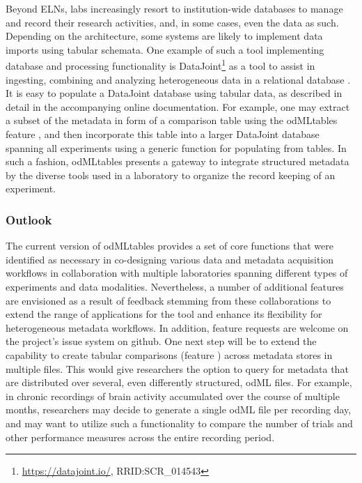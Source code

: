 Beyond ELNs, labs increasingly resort to institution-wide databases to manage and record their research activities, and, in some cases, even the data as such. Depending on the architecture, some systems are likely to implement data imports using tabular schemata. One example of such a tool implementing database and processing functionality is DataJoint\footnote{\url{https://datajoint.io/}, RRID:SCR\_014543} as a tool to assist in ingesting, combining and analyzing heterogeneous data in a relational database \citep{Yatsenko_2015}. It is easy to populate a DataJoint database using tabular data, as described in detail in the accompanying online documentation. For example, one may extract a subset of the metadata in form of a comparison table using the odMLtables feature \fcompare, and then incorporate this table into a larger DataJoint database spanning all experiments using a generic function for populating from  tables. In such a fashion, odMLtables presents a gateway to integrate structured metadata by the diverse tools used in a laboratory to organize the record keeping of an experiment.

\subsubsection{Outlook}
The current version of odMLtables provides a set of core functions that were identified as necessary in co-designing various data and metadata acquisition workflows in collaboration with multiple laboratories spanning different types of experiments and data modalities. Nevertheless, a number of additional features are envisioned as a result of feedback stemming from these collaborations to extend the range of applications for the tool and enhance its flexibility for heterogeneous metadata workflows. In addition, feature requests are welcome on the project's issue system on github. One next step will be to extend the capability to create tabular comparisons (feature \fcompare) across metadata stores in multiple files. This would give researchers the option to query for metadata that are distributed over several, even differently structured, odML files. For example, in chronic recordings of brain activity accumulated over the course of multiple months, researchers may decide to generate a single odML file per recording day, and may want to utilize such a functionality to compare the number of trials and other performance measures across the entire recording period.

